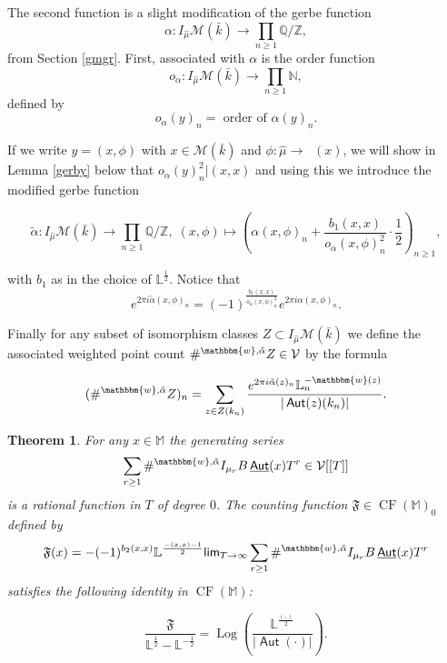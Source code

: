 \documentclass{article}
\newcommand{\MF}{\mathfrak{F}}
\renewcommand{\lim}{\mathsf{lim}}
\DeclareMathOperator{\Aut}{\mathsf{Aut}}
\DeclareMathOperator{\uAut}{\underline{\mathsf{Aut}}}
\newcommand{\BL}{{\mathbb{L}}}
\newcommand{\BM}{{\mathbb{M}}}
\newcommand{\BN}{{\mathbb{N}}}
\newcommand{\BQ}{{\mathbb{Q}}}
\newcommand{\BZ}{{\mathbb{Z}}}
\newcommand{\Bw}{\mathbbm{w}}
\newcommand{\CM}{{\mathcal M}}
\newcommand{\CV}{{\mathcal V}}
\DeclareMathOperator{\mcf}{CF}
\DeclareMathOperator{\Log}{Log}
\theoremstyle{definition}
\theoremstyle{plain}
\newtheorem{theorem}[definition]{Theorem}
\begin{document}
The second function is a slight modification of the gerbe function
\[ \alpha\colon  I_{\hat{\mu}}\CM(\bar{k}) \rightarrow \prod_{n\geq 1}\BQ/\BZ,\]
from Section \ref{gmgr}. First, associated with $\alpha$ is the order function
\[o_\alpha\colon  I_{\hat{\mu}}\CM(\bar{k}) \rightarrow \prod_{n\geq 1}\BN, \]
defined by 
\[o_\alpha(y)_n = \text{ order of } \alpha(y)_n.\]

If we write $y = (x,\phi)$ with $x\in \CM(\bar{k})$ and $\phi: \hat{\mu} \to \uAut(x)$, we will show in Lemma \ref{gerby} below that $o_\alpha(y)_n^2 |  (x,x)$ and using this we introduce the modified gerbe function 



\[ \tilde\alpha: I_{\hat{\mu}}\CM(\bar{k}) \rightarrow \prod_{n\geq 1}\BQ/\BZ, \; (x,\phi) \mapsto (\alpha(x,\phi)_n+ \frac{b_1(x,x)}{o_\alpha(x,\phi)_n^2}\cdot \frac{1}{2})_{n\geq 1},\]

with $b_1$ as in the choice of $\BL^{\frac{1}{2}}$. Notice that 
\begin{equation}\label{modal} e^{2\pi i \tilde\alpha(x,\phi)_n} = (-1)^{\frac{b_1(x,x)}{o_\alpha(x,\phi)_n^2}}e^{2\pi i \alpha(x,\phi)_n}.\end{equation}



Finally for any subset of isomorphism classes $Z \subset I_{\hat{\mu}}\CM(\bar{k})$ we define the associated weighted point count $ \#^{\Bw,\tilde\alpha}Z \in \CV$ by the formula

\[  (\#^{\Bw,\tilde\alpha}Z)_n = \sum_{z \in Z(k_n)} \frac{e^{2\pi i \tilde\alpha(z)_n} \BL_n^{-\Bw(z)}}{|\Aut(z)(k_n)|}.\]

 



\begin{theorem}\label{plid} For any $x \in \BM$ the generating series
\[ \sum_{r \geq 1} \#^{\Bw,\tilde\alpha} I_{\mu_r}B\uAut(x) T^r \in \CV[[T]] \]
is a rational function in $T$ of degree $0$. The counting function $\MF \in \mcf(\BM)_0$ defined by 
\begin{equation}\label{limfor} \MF(x) = -(-1)^{b_2(x,x)}\BL^{\frac{-(x,x)-1}{2}}\lim_{T\to \infty}\sum_{r \geq 1} \#^{\Bw,\tilde\alpha} I_{\mu_r}B\uAut(x) T^r   \end{equation}
satisfies the following identity in $\mcf(\BM)$:

\begin{equation}\label{plelog}    
\frac{\MF}{\BL^{\frac{1}{2}} - \BL^{-\frac{1}{2}}} = \Log\left( \frac{\BL^{\frac{(,)}{2}}}{|\Aut(\cdot)|}  \right).\end{equation}
\end{theorem}
\end{document}
